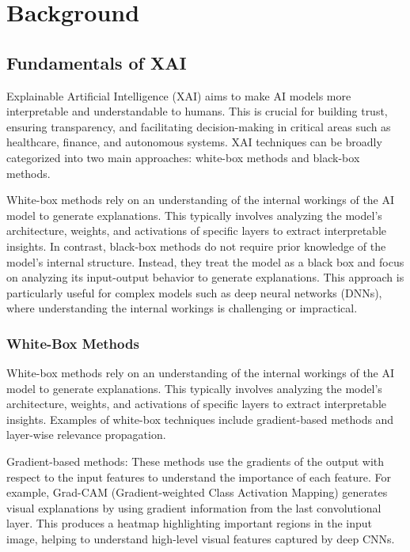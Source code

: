 \documentclass{article}
\begin{document}
\section{Background}

\subsection{Fundamentals of XAI}

Explainable Artificial Intelligence (XAI) aims to make AI models more interpretable and understandable to humans. This is crucial for building trust, ensuring transparency, and facilitating decision-making in critical areas such as healthcare, finance, and autonomous systems. XAI techniques can be broadly categorized into two main approaches: white-box methods and black-box methods.

White-box methods rely on an understanding of the internal workings of the AI model to generate explanations. This typically involves analyzing the model’s architecture, weights, and activations of specific layers to extract interpretable insights. In contrast, black-box methods do not require prior knowledge of the model’s internal structure. Instead, they treat the model as a black box and focus on analyzing its input-output behavior to generate explanations. This approach is particularly useful for complex models such as deep neural networks (DNNs), where understanding the internal workings is challenging or impractical.

\subsubsection{White-Box Methods}
White-box methods rely on an understanding of the internal workings of the AI model to generate explanations. This typically involves analyzing the model’s architecture, weights, and activations of specific layers to extract interpretable insights. Examples of white-box techniques include gradient-based methods and layer-wise relevance propagation.

Gradient-based methods: These methods use the gradients of the output with respect to the input features to understand the importance of each feature. For example, Grad-CAM (Gradient-weighted Class Activation Mapping) generates visual explanations by using gradient information from the last convolutional layer. This produces a heatmap highlighting important regions in the input image, helping to understand high-level visual features captured by deep CNNs.
\end{document}
